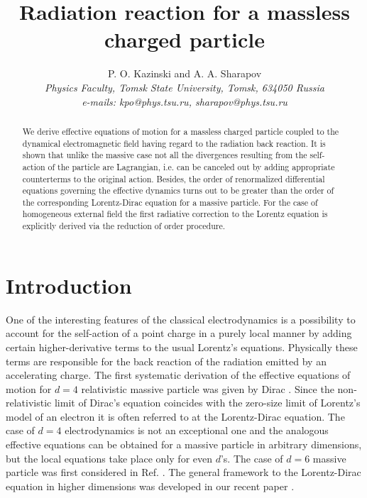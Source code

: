 \documentclass[a4paper,12pt]{article}
\title{\bf Radiation reaction for a massless charged particle}
\author {P. O. Kazinski
and A. A. Sharapov \protect\\
{ \it Physics Faculty, Tomsk State University, Tomsk, 634050  Russia }\\
{\it e-mails:  kpo@phys.tsu.ru,  sharapov@phys.tsu.ru }}
\begin{document}
\maketitle



\begin{abstract}

We derive effective equations of motion for a massless charged
particle coupled to the dynamical electromagnetic field having
regard to the radiation back reaction. It is shown that unlike the
massive case not all the divergences resulting from the
self-action of the particle are Lagrangian, i.e. can be canceled
out by adding appropriate counterterms to the original action.
Besides, the order of renormalized differential equations
governing the effective dynamics turns out to be greater than the
order of the corresponding Lorentz-Dirac equation for a massive
particle. For the case of homogeneous external field the first
radiative correction to the Lorentz equation is explicitly derived
via the reduction of order procedure.

\end{abstract}

\def\thesection{\arabic{section}}
\def\theequation{\arabic{equation}}






\section{Introduction}

One of the interesting features of the classical electrodynamics
is a possibility to account for the self-action of a point charge
in a purely local manner by adding certain higher-derivative terms
to the usual Lorentz's equations. Physically these terms are
responsible for the back reaction of the radiation emitted by an
accelerating charge. The first systematic derivation of the
effective equations of motion for $d=4$ relativistic massive
particle was given by Dirac \cite{Dirac}. Since the
non-relativistic limit of Dirac's equation coincides with the
zero-size limit of Lorentz's model of an electron \cite{Lorentz}
it is often referred to at the Lorentz-Dirac equation. The case of
$d=4$ electrodynamics is not an exceptional one and the analogous
effective equations can be obtained for a massive particle in
arbitrary dimensions, but the local equations take place only for
even $d$'s. The case of $d=6$ massive particle was first
considered in Ref. \cite{Kos}. The general framework to the
Lorentz-Dirac equation in higher dimensions was developed in our
recent paper \cite{KLS}.
\end{document}
